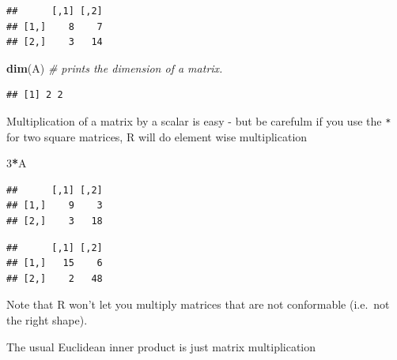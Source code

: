\documentclass[]{book}
\newenvironment{Shaded}{\begin{snugshade}}{\end{snugshade}}
\newcommand{\CommentTok}[1]{\textcolor[rgb]{0.56,0.35,0.01}{\textit{#1}}}
\newcommand{\DecValTok}[1]{\textcolor[rgb]{0.00,0.00,0.81}{#1}}
\newcommand{\KeywordTok}[1]{\textcolor[rgb]{0.13,0.29,0.53}{\textbf{#1}}}
\newcommand{\NormalTok}[1]{#1}
\newcommand{\OperatorTok}[1]{\textcolor[rgb]{0.81,0.36,0.00}{\textbf{#1}}}
\newcommand{\StringTok}[1]{\textcolor[rgb]{0.31,0.60,0.02}{#1}}
\theoremstyle{definition}
\theoremstyle{definition}
\theoremstyle{definition}
\theoremstyle{remark}
\begin{document}
\begin{verbatim}
##      [,1] [,2]
## [1,]    8    7
## [2,]    3   14
\end{verbatim}

\begin{Shaded}
\begin{Highlighting}[]
\KeywordTok{dim}\NormalTok{(A)                           }\CommentTok{# prints the dimension of a matrix.}
\end{Highlighting}
\end{Shaded}

\begin{verbatim}
## [1] 2 2
\end{verbatim}

Multiplication of a matrix by a scalar is easy - but be carefulm if you use the \texttt{*} for two square matrices, R will do element wise multiplication

\begin{Shaded}
\begin{Highlighting}[]
\DecValTok{3}\OperatorTok{*}\NormalTok{A}
\end{Highlighting}
\end{Shaded}

\begin{verbatim}
##      [,1] [,2]
## [1,]    9    3
## [2,]    3   18
\end{verbatim}

\begin{Shaded}
\end{Shaded}

\begin{verbatim}
##      [,1] [,2]
## [1,]   15    6
## [2,]    2   48
\end{verbatim}

Note that R won't let you multiply matrices that are not conformable (i.e.~not the right shape).

The usual Euclidean inner product is just matrix multiplication

\begin{Shaded}
\end{Shaded}
\end{document}
